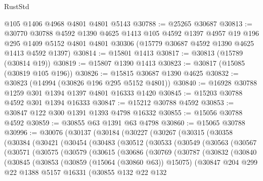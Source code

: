 \begin{lexlean}{RustStd}
\begin{coremodule}
    @105
    @1406
    @4968
    @4801
    @4801
    @5143
@30788 := @25265 @30687
@30813 := @30770
    @30788
    @4592
    @1390
    @4625
    @1413
    @105
    @4592
    @1397
    @4957
    @19
    @196
    @295
    @1409
    @5152
    @4801
    @4801
    @30306
    (@15779 @30687 @4592 @1390 @4625 @1413 @4592 @1397)
@30814 := @15801 @1413
@30817 := @30813 (@15789 (@30814 @19))
@30819 := @15807 @1390 @1413
@30823 := @30817 (@15085 (@30819 @105 @196))
@30826 := @15815 @30687 @1390 @4625
@30832 := @30823 (@14994 (@30826 @196 @295 @5152 @4801))
@30840 := @16928 @30788 @1259 @301 @1394 @1397 @4801 @16333 @1420
@30845 := @15203 @30788 @4592 @301 @1394 @16333
@30847 := @15212 @30788 @4592
@30853 := @30847 @122 @300 @1391 @1393 @4798 @16332
@30855 := @15056 @30788 @4592
@30859 := @30855 @63 @1391 @63 @4798
@30860 := @15065 @30788
@30996 := @30076
    (@30137
      (@30184
        (@30227
          (@30267
            (@30315
              (@30358
                (@30384
                  (@30421
                    (@30454
                      (@30483
                        (@30512
                          (@30533
                            (@30549
                              (@30563
                                (@30567
                                  (@30571
                                    (@30575
                                      (@30579
                                        (@30615
                                          (@30686
                                            (@30769
                                              (@30787
                                                (@30832
                                                  (@30840
                                                    (@30845
                                                      (@30853
                                                        (@30859 (@15064 (@30860 @63)) @15075)
                                                        (@30847
                                                          @204
                                                          @299
                                                          @22
                                                          @1388
                                                          @5157
                                                          @16331
                                                          (@30855
                                                            @132
                                                            @22
                                                            @132

\end{coremodule}
\end{lexlean}
